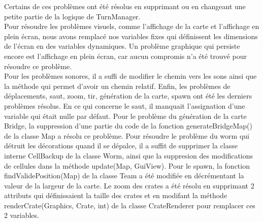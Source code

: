 \documentclass[a4paper, 12pt]{article}
\begin{document}
            Certains de ces problèmes ont été résolus en supprimant ou en changeant une petite partie de la logique de TurnManager.\\
            Pour résoudre les problèmes visuels, comme l'affichage de la carte et l'affichage en plein écran, nous avons remplacé nos variables fixes qui définissent les dimensions de l'écran en des variables dynamiques.
            Un problème graphique qui persiste encore est l'affichage en plein écran, car aucun compromis n'a été trouvé pour résoudre ce problème.\\
            Pour les problèmes sonores, il a suffi de modifier le chemin vers les sons ainsi que la méthode qui permet d'avoir un chemin relatif.
            Enfin, les problèmes de déplacements, saut, zoom, tir, génération de la carte, spawn ont été les derniers problèmes résolus.
            En ce qui concerne le saut, il manquait l'assignation d'une variable qui était nulle par défaut.
            Pour le problème du génération de la carte Bridge, la suppression d'une partie du code de la fonction generateBridgeMap() de la classe Map a résolu ce problème.
            Pour résoudre le problème du worm qui détruit les décorations quand il se dépalce, il a suffit de supprimer la classe interne CellBackup de la classe Worm, ainsi que la suppresion des modifications de cellules dans la méthode update(Map, GuiView).
            Pour le spawn, la fonction findValidePosition(Map) de la classe Team a été modifiée en décrémentant la valeur de la largeur de la carte.
            Le zoom des crates a été résolu en supprimant 2 attributs qui définissaient la taille des crates et en modifant la méthode renderCrate(Graphics, Crate, int) de la classe CrateRenderer pour remplacer ces 2 variables.
\end{document}
